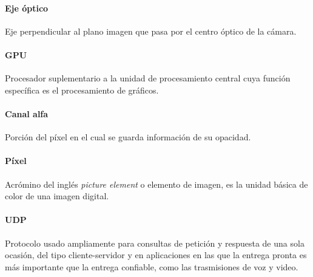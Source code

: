 \paragraph{Eje óptico}
Eje perpendicular al plano imagen que pasa por el centro óptico de la cámara.

\paragraph{GPU}
Procesador suplementario a la unidad de procesamiento central cuya función específica es el procesamiento de gráficos.

\paragraph{Canal alfa}
Porción del píxel en el cual se guarda información de su opacidad.

\paragraph{Píxel}
Acrómino del inglés \emph{picture element} o elemento de imagen, es la unidad básica de color de una imagen digital.

\paragraph{UDP}
Protocolo usado ampliamente para consultas de petición y respuesta de una sola ocasión, del tipo cliente-servidor y en aplicaciones en las que la entrega pronta es más importante que la entrega confiable, como las trasmisiones de voz y video.
